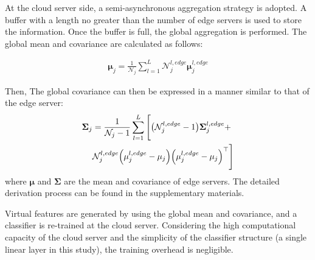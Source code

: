 \documentclass[journal]{IEEEtran}
\begin{document}
At the cloud server side, a semi-asynchronous aggregation strategy is adopted. A buffer with a length no greater than the number of edge servers is used to store the information. Once the buffer is full, the global aggregation is performed. The global mean and covariance are calculated as follows:  

\begin{align}
  \label{cloud mean}
  \mathbf{\mu}_j = \frac{1}{\mathcal{N}_{j}} \sum_{l=1}^{L} \mathcal{N}^{l,edge}_{j} \mathbf{\mu}^{l,edge}_{j}
  \end{align}
  
  Then, The global covariance can then be expressed in a manner similar to that of the edge server:
  \begin{align}
  \label{cloud covariance}
  \mathbf{\Sigma}_j &= \frac{1}{\mathcal{N}_{j} - 1} \sum_{l=1}^{L} \Bigg[
  \big(\mathcal{N}^{l,edge}_{j}-1\big) \mathbf{\Sigma}^{l,edge}_{j} + \notag \\
  &\mathcal{N}^{l,edge}_{j} \Big(\mathbf{\mu}^{l,edge}_{j} - \mathbf{\mu}_j \Big) \Big(\mathbf{\mu}^{l,edge}_{j} - \mathbf{\mu}_j \Big)^\top \Bigg]
\end{align}
where \( \mathbf{\mu}\) and \( \mathbf{\Sigma} \) are the mean and covariance of edge servers. The detailed derivation process can be found in the supplementary materials.

Virtual features are generated by using the global mean and covariance, and a classifier is re-trained at the cloud server. Considering the high computational capacity of the cloud server and the simplicity of the classifier structure (a single linear layer in this study), the training overhead is negligible.  
\end{document}
